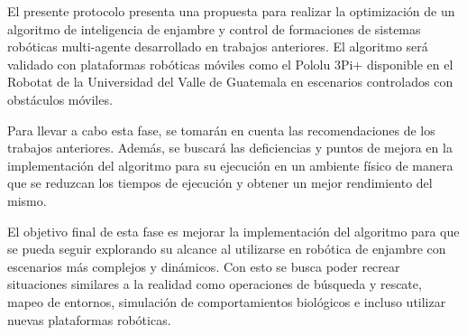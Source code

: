 El presente protocolo presenta una propuesta para realizar la optimización de un algoritmo de inteligencia de enjambre y control de formaciones de sistemas robóticas multi-agente desarrollado en trabajos anteriores.
El algoritmo será validado con plataformas robóticas móviles como el Pololu 3Pi+ disponible en el Robotat de la Universidad del Valle de Guatemala en escenarios controlados con obstáculos móviles.

Para llevar a cabo esta fase, se tomarán en cuenta las recomendaciones de los trabajos anteriores. Además, se buscará las deficiencias y puntos de mejora en la implementación del algoritmo para su ejecución en un ambiente físico de manera que se reduzcan los tiempos de ejecución y obtener un mejor rendimiento del mismo.

El objetivo final de esta fase es mejorar la implementación del algoritmo para que se pueda seguir explorando su alcance al utilizarse en robótica de enjambre con escenarios más complejos y dinámicos. Con esto se busca poder recrear situaciones similares a la realidad como operaciones de búsqueda y rescate, mapeo de entornos, simulación de comportamientos biológicos e incluso utilizar nuevas plataformas robóticas.